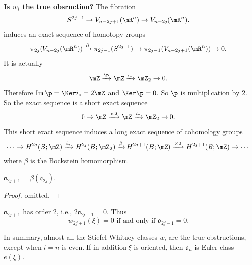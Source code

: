 \noindent\textbf{Is $w_i$ the true obsruction?}
The fibration 
\begin{equation*}
    S^{2j-1}\to V_{n-2j+1}(\mR^n)\to V_{n-2j}(\mR^n).
\end{equation*}
induces an exact sequence of homotopy groups
\begin{equation*}
    \pi_{2j}(V_{n-2j}(\mR^n)) \xrightarrow{\partial} 
    \pi_{2j-1}(S^{2j-1})\to \pi_{2j-1} (V_{n-2j+1}(\mR^n)) \to 0.
\end{equation*}
It is actually 
\begin{equation*}
    \mZ \xrightarrow{\p} \mZ \xrightarrow{i_*} \mZ_2 \to 0.
\end{equation*}
Therefore $\mathrm{Im}\,\p=\Ker i_* = 2\mZ$ and $\Ker\p = 0$. So $\p$ is
multiplication by 2. So the exact sequence is a short exact sequence
\begin{equation*}
    0\to \mZ \xrightarrow{\times 2} \mZ \xrightarrow{i_*} \mZ_2 \to 0.
\end{equation*}
This short exact sequence induces a long exact sequence of cohomology groups
\begin{equation*}
    \cdots \to H^{2j}(B;\mZ) 
    \xrightarrow{i_*} H^{2j}(B;\mZ_2) \xrightarrow{\beta} H^{2j+1}(B;\mZ) 
    \xrightarrow{\times 2} H^{2j+1}(B;\mZ) \to \cdots
\end{equation*}
where $\beta$ is the Bockstein homomorphism.
\begin{theorem}
    $\mathfrak{o}_{2j+1} = \beta(\mathfrak{o}_{2j})$.
\end{theorem}
\begin{proof}
    omitted.
\end{proof}
\begin{corollary}
    $\mathfrak{o}_{2j+1}$ has order 2, i.e., 
    $2\mathfrak{o}_{2j+1} = 0$. Thus 
    \begin{equation*}
        w_{2j+1}(\xi) = 0 \text{ if and only if } 
        \mathfrak{o}_{2j+1} = 0.
    \end{equation*}
\end{corollary}
In summary, almost all the Stiefel-Whitney classes $w_i$ are the true 
obstructions, except when $i=n$ is even. If in addition $\xi$ is oriented, 
then $\mathfrak{o}_n$ is Euler class $e(\xi)$.